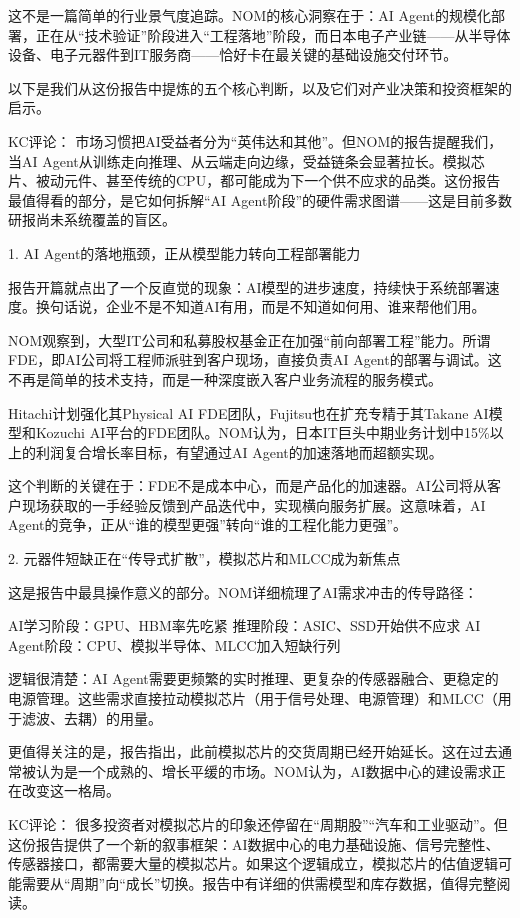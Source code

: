 \documentclass[11pt]{ctexart}
\begin{document}
这不是一篇简单的行业景气度追踪。NOM的核心洞察在于：AI Agent的规模化部署，正在从“技术验证”阶段进入“工程落地”阶段，而日本电子产业链——从半导体设备、电子元器件到IT服务商——恰好卡在最关键的基础设施交付环节。

以下是我们从这份报告中提炼的五个核心判断，以及它们对产业决策和投资框架的启示。

KC评论： 市场习惯把AI受益者分为“英伟达和其他”。但NOM的报告提醒我们，当AI Agent从训练走向推理、从云端走向边缘，受益链条会显著拉长。模拟芯片、被动元件、甚至传统的CPU，都可能成为下一个供不应求的品类。这份报告最值得看的部分，是它如何拆解“AI Agent阶段”的硬件需求图谱——这是目前多数研报尚未系统覆盖的盲区。

1. AI Agent的落地瓶颈，正从模型能力转向工程部署能力

报告开篇就点出了一个反直觉的现象：AI模型的进步速度，持续快于系统部署速度。换句话说，企业不是不知道AI有用，而是不知道如何用、谁来帮他们用。

NOM观察到，大型IT公司和私募股权基金正在加强“前向部署工程”能力。所谓FDE，即AI公司将工程师派驻到客户现场，直接负责AI Agent的部署与调试。这不再是简单的技术支持，而是一种深度嵌入客户业务流程的服务模式。

Hitachi计划强化其Physical AI FDE团队，Fujitsu也在扩充专精于其Takane AI模型和Kozuchi AI平台的FDE团队。NOM认为，日本IT巨头中期业务计划中15\%以上的利润复合增长率目标，有望通过AI Agent的加速落地而超额实现。

这个判断的关键在于：FDE不是成本中心，而是产品化的加速器。AI公司将从客户现场获取的一手经验反馈到产品迭代中，实现横向服务扩展。这意味着，AI Agent的竞争，正从“谁的模型更强”转向“谁的工程化能力更强”。

2. 元器件短缺正在“传导式扩散”，模拟芯片和MLCC成为新焦点

这是报告中最具操作意义的部分。NOM详细梳理了AI需求冲击的传导路径：

AI学习阶段：GPU、HBM率先吃紧 推理阶段：ASIC、SSD开始供不应求 AI Agent阶段：CPU、模拟半导体、MLCC加入短缺行列

逻辑很清楚：AI Agent需要更频繁的实时推理、更复杂的传感器融合、更稳定的电源管理。这些需求直接拉动模拟芯片（用于信号处理、电源管理）和MLCC（用于滤波、去耦）的用量。

更值得关注的是，报告指出，此前模拟芯片的交货周期已经开始延长。这在过去通常被认为是一个成熟的、增长平缓的市场。NOM认为，AI数据中心的建设需求正在改变这一格局。

KC评论： 很多投资者对模拟芯片的印象还停留在“周期股”“汽车和工业驱动”。但这份报告提供了一个新的叙事框架：AI数据中心的电力基础设施、信号完整性、传感器接口，都需要大量的模拟芯片。如果这个逻辑成立，模拟芯片的估值逻辑可能需要从“周期”向“成长”切换。报告中有详细的供需模型和库存数据，值得完整阅读。
\end{document}
